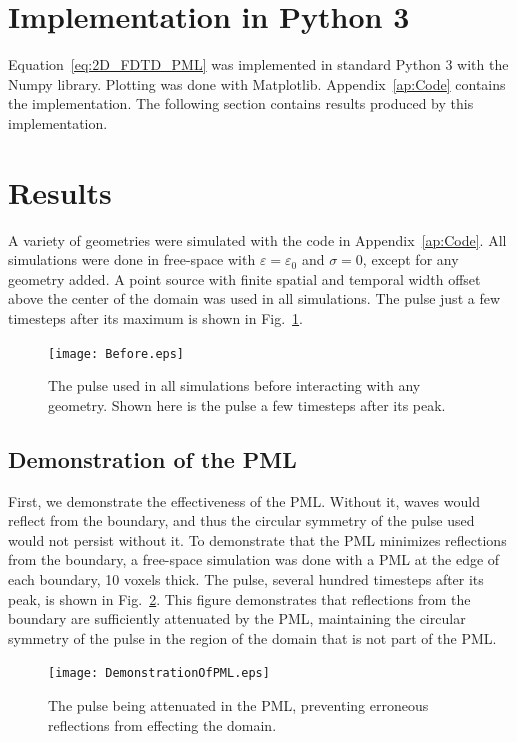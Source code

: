 \documentclass[12pt,twocolumn]{article}
\begin{document}
\section{Implementation in Python 3}
Equation~\ref{eq:2D_FDTD_PML} was implemented in standard Python 3 with the Numpy library. Plotting was done with Matplotlib. Appendix~\ref{ap:Code} contains the implementation. The following section contains results produced by this implementation.
\section{Results}
A variety of geometries were simulated with the code in Appendix~\ref{ap:Code}. All simulations were done in free-space with $\varepsilon = \varepsilon_0$ and $\sigma=0$, except for any geometry added. A point source with finite spatial and temporal width offset above the center of the domain was used in all simulations. The pulse just a few timesteps after its maximum is shown in Fig.~\ref{fig:before}.
\begin{figure}
\centering
\texttt{[image: Before.eps]}
\caption{The pulse used in all simulations before interacting with any geometry. Shown here is the pulse a few timesteps after its peak.}
\label{fig:before}
\end{figure}
\subsection{Demonstration of the PML}
First, we demonstrate the effectiveness of the PML. Without it, waves would reflect from the boundary, and thus the circular symmetry of the pulse used would not persist without it. To demonstrate that the PML minimizes reflections from the boundary, a free-space simulation was done with a PML at the edge of each boundary, 10 voxels thick. The pulse, several hundred timesteps after its peak, is shown in Fig.~\ref{fig:PMLsim}. This figure demonstrates that reflections from the boundary are sufficiently attenuated by the PML, maintaining the circular symmetry of the pulse in the region of the domain that is not part of the PML.
\begin{figure}
\centering
\texttt{[image: DemonstrationOfPML.eps]}
\caption{The pulse being attenuated in the PML, preventing erroneous reflections from effecting the domain.}
\label{fig:PMLsim}
\end{figure}
\end{document}
